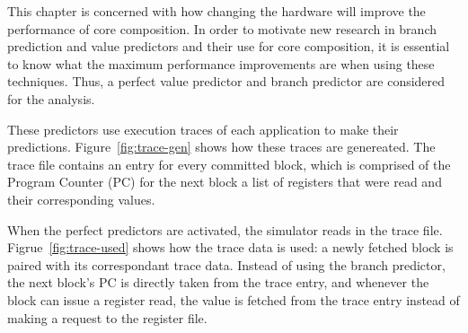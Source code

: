 This chapter is concerned with how changing the hardware will improve the performance of core composition.
In order to motivate new research in branch prediction and value predictors and their use for core composition, it is essential to know what the maximum performance improvements are when using these techniques. %
Thus, a perfect value predictor and branch predictor are considered for the analysis.

These predictors use execution traces of each application to make their predictions.
Figure~\ref{fig:trace-gen} shows how these traces are genereated.
The trace file contains an entry for every committed block, which is comprised of the Program Counter (PC) for the next block a list of registers that were read and their corresponding values.

When the perfect predictors are activated, the simulator reads in the trace file.
Figrue~\ref{fig:trace-used} shows how the trace data is used: a newly fetched block is paired with its correspondant trace data.
Instead of using the branch predictor, the next block's PC is directly taken from the trace entry, and whenever the block can issue a register read, the value is fetched from the trace entry instead of making a request to the register file.
\vspace{-2em}